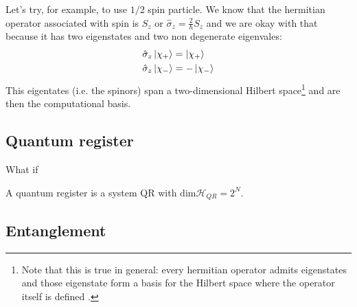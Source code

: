 Let's try, for example, to use $1/2$ spin particle. We know that the hermitian operator associated with spin is $S_z$ or $\hat{\sigma}_z = \frac{2}{\hbar} S_z$ and we are okay with that because it has two eigenstates and two non degenerate eigenvales:
\begin{align*}
    &\hat{\sigma}_z \ket{\chi_+} = \ket{\chi_+}  \\
    &\hat{\sigma}_z \ket{\chi_-} = -\ket{\chi_-}
\end{align*}
This eigentates (i.e. the spinors) span a two-dimensional Hilbert space\footnote{Note that this is true in general: every hermitian operator admits eigenstates and those eigenstate form a basis for the Hilbert space where the operator itself is defined \cite[p.100]{Shankar}.} and are then the computational basis.
\subsection{Quantum register}
What if 
\begin{defn}
A quantum register is a system QR  with $\text{dim}\mathcal{H}_{QR} = 2^N$.
\end{defn}
\subsection{Entanglement}